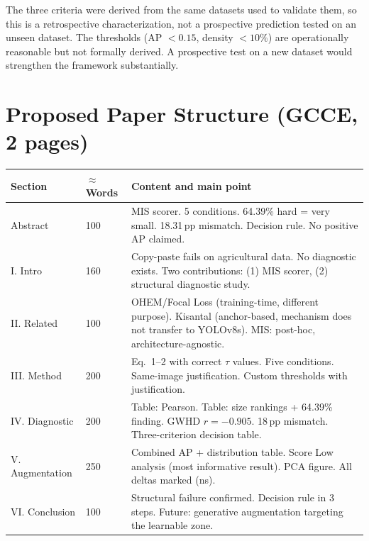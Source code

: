 \documentclass[10pt, a4paper]{article}
\begin{document}
The three criteria were derived from the same datasets used to validate
them, so this is a retrospective characterization, not a prospective
prediction tested on an unseen dataset.
The thresholds (AP $<0.15$, density $<10\%$) are operationally
reasonable but not formally derived.
A prospective test on a new dataset would strengthen the framework
substantially.

\section{Proposed Paper Structure (GCCE, 2 pages)}

\begin{center}
\small
\begin{tabular}{llp{10cm}}
\toprule
\textbf{Section} & \textbf{$\approx$Words} & \textbf{Content and main point} \\
\midrule
Abstract      & 100 & MIS scorer. 5 conditions. 64.39\% hard = very small.
  18.31\,pp mismatch. Decision rule. No positive AP claimed. \\
I. Intro      & 160 & Copy-paste fails on agricultural data.
  No diagnostic exists.
  Two contributions: (1) MIS scorer, (2) structural diagnostic study. \\
II. Related   & 100 & OHEM/Focal Loss (training-time, different purpose).
  Kisantal (anchor-based, mechanism does not transfer to YOLOv8s).
  MIS: post-hoc, architecture-agnostic. \\
III. Method   & 200 & Eq.~1--2 with correct $\tau$ values.
  Five conditions. Same-image justification.
  Custom thresholds with justification. \\
IV. Diagnostic& 200 & Table: Pearson. Table: size rankings + 64.39\% finding.
  GWHD $r=-0.905$. 18\,pp mismatch.
  Three-criterion decision table. \\
V. Augmentation & 250 & Combined AP + distribution table.
  Score Low analysis (most informative result).
  PCA figure. All deltas marked (ns). \\
VI. Conclusion & 100 & Structural failure confirmed.
  Decision rule in 3 steps.
  Future: generative augmentation targeting the learnable zone. \\
\bottomrule
\end{tabular}
\end{center}

\end{document}
